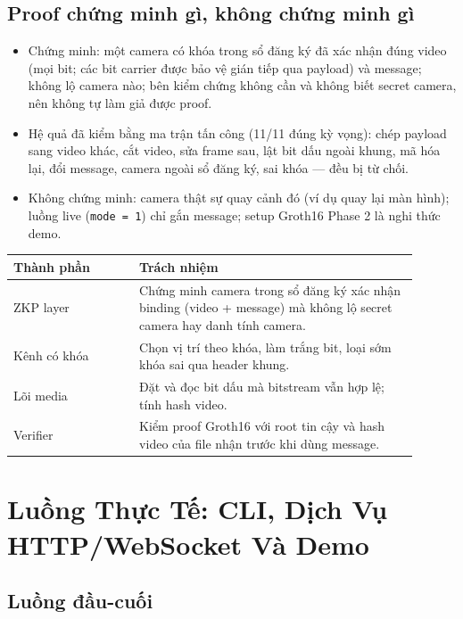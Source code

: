 \documentclass[11pt,a4paper]{article}
\begin{document}
\subsection{Proof chứng minh gì, không chứng minh gì}

\begin{itemize}[leftmargin=*]
  \item Chứng minh: một camera có khóa trong sổ đăng ký đã xác nhận đúng video (mọi
  bit; các bit carrier được bảo vệ gián tiếp qua payload) và message; không lộ camera
  nào; bên kiểm chứng không cần và không biết secret camera, nên không tự làm giả được
  proof.
  \item Hệ quả đã kiểm bằng ma trận tấn công (11/11 đúng kỳ vọng): chép payload sang
  video khác, cắt video, sửa frame sau, lật bit dấu ngoài khung, mã hóa lại, đổi
  message, camera ngoài sổ đăng ký, sai khóa --- đều bị từ chối.
  \item Không chứng minh: camera thật sự quay cảnh đó (ví dụ quay lại màn hình); luồng
  live (\texttt{mode = 1}) chỉ gắn message; setup Groth16 Phase 2 là nghi thức demo.
\end{itemize}

\begin{center}
\begin{tabular}{p{0.28\linewidth}p{0.62\linewidth}}
\toprule
Thành phần & Trách nhiệm \\
\midrule
ZKP layer & Chứng minh camera trong sổ đăng ký xác nhận binding (video + message) mà không lộ secret camera hay danh tính camera. \\
Kênh có khóa & Chọn vị trí theo khóa, làm trắng bit, loại sớm khóa sai qua header khung. \\
Lõi media & Đặt và đọc bit dấu mà bitstream vẫn hợp lệ; tính hash video. \\
Verifier & Kiểm proof Groth16 với root tin cậy và hash video của file nhận trước khi dùng message. \\
\bottomrule
\end{tabular}
\end{center}

\section{Luồng Thực Tế: CLI, Dịch Vụ HTTP/WebSocket Và Demo}

\subsection{Luồng đầu-cuối}
\end{document}
